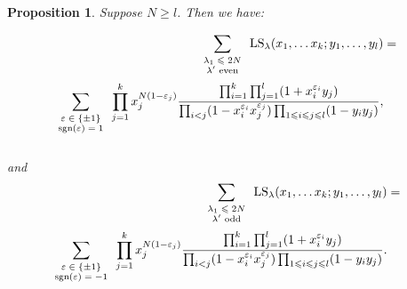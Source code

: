 \documentclass[11pt]{amsart}
\newcommand{\tmop}[1]{\ensuremath{\operatorname{#1}}}
\newtheorem{proposition}{Proposition}
\newcommand{\tmscript}[1]{\text{\scriptsize $#1$}}
\begin{document}
\begin{proposition}  Suppose $N \geqslant l$.  Then we have:

\begin{eqnarray*}
  \sum_{\tmscript{\begin{array}{c}
    \lambda_1 \leqslant 2 N\\
    \text{$\lambda'$ even}
  \end{array}}} \tmop{LS}_{\lambda} ( x_1, \ldots x_k ; y_1, \ldots, y_l ) & =
  & \\
  \sum_{\tmscript{\begin{array}{c}
    \varepsilon \in \{ \pm 1 \}\\
    \tmop{sgn} ( \varepsilon ) = 1
  \end{array}}} \prod_{j = 1}^k x_j^{N ( 1 - \varepsilon_j )} \frac{\prod_{i =
  1}^k \prod_{j = 1}^l ( 1 + x_i^{\varepsilon_i} y_j )}{\prod_{i < j} ( 1 -
  x_i^{\varepsilon_i} x_j^{\varepsilon_j} ) \prod_{1 \leqslant i \leqslant j
  \leqslant l} ( 1 - y_i y_j )}, &  & \\
  &  &
\end{eqnarray*}
and
\begin{eqnarray*}
  \sum_{\tmscript{\begin{array}{c}
    \lambda_1 \leqslant 2 N\\
    \text{$\lambda'$ odd}
  \end{array}}} \tmop{LS}_{\lambda} ( x_1, \ldots x_k ; y_1, \ldots, y_l ) & =
  & \\
  \sum_{\tmscript{\begin{array}{c}
    \varepsilon \in \{ \pm 1 \}\\
    \tmop{sgn} ( \varepsilon ) = - 1
  \end{array}}} \prod_{j = 1}^k x_j^{N ( 1 - \varepsilon_j )} \frac{\prod_{i =
  1}^k \prod_{j = 1}^l ( 1 + x_i^{\varepsilon_i} y_j )}{\prod_{i < j} ( 1 -
  x_i^{\varepsilon_i} x_j^{\varepsilon_j} ) \prod_{1 \leqslant i \leqslant j
  \leqslant l} ( 1 - y_i y_j )}. &  & \\
  &  &
\end{eqnarray*}
\end{proposition}
\end{document}
